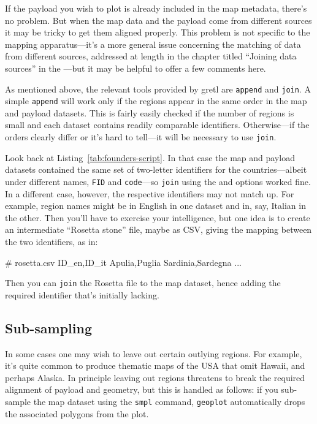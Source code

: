 \documentclass{article}
\begin{document}
If the payload you wish to plot is already included in the map
metadata, there's no problem. But when the map data and the payload
come from different sources it may be tricky to get them aligned
properly. This problem is not specific to the mapping apparatus---it's
a more general issue concerning the matching of data from different
sources, addressed at length in the chapter titled ``Joining data
sources'' in the \GUG{}---but it may be helpful to offer a few
comments here.

As mentioned above, the relevant tools provided by gretl are
\texttt{append} and \texttt{join}. A simple \texttt{append} will work
only if the regions appear in the same order in the map and payload
datasets. This is fairly easily checked if the number of regions is
small and each dataset contains readily comparable
identifiers. Otherwise---if the orders clearly differ or it's hard to
tell---it will be necessary to use \texttt{join}.

Look back at Listing~\ref{tab:founders-script}. In that case the map
and payload datasets contained the same set of two-letter identifiers
for the countries---albeit under different names, \texttt{FID} and
\texttt{code}---so \texttt{join} using the  and
 options worked fine. In a different case, however, the
respective identifiers may not match up. For example, region names
might be in English in one dataset and in, say, Italian in the
other. Then you'll have to exercise your intelligence, but one idea is
to create an intermediate ``Rosetta stone'' file, maybe as CSV, giving
the mapping between the two identifiers, as in:
\begin{code}
# rosetta.csv
ID_en,ID_it
Apulia,Puglia
Sardinia,Sardegna
...
\end{code}
Then you can \texttt{join} the Rosetta file to the map dataset, hence
adding the required identifier that's initially lacking.

\subsection{Sub-sampling}
\label{sec:sub-sample}

In some cases one may wish to leave out certain outlying regions. For
example, it's quite common to produce thematic maps of the USA that
omit Hawaii, and perhaps Alaska. In principle leaving out regions
threatens to break the required alignment of payload and geometry, but
this is handled as follows: if you sub-sample the map dataset using
the \texttt{smpl} command, \texttt{geoplot} automatically drops the
associated polygons from the plot.
\end{document}
